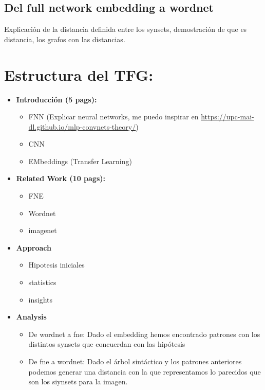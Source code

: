\documentclass[12,twoside]{TFG-GM}
\theoremstyle{definition}
\theoremstyle{remark}
\begin{document}
\subsection{Del full network embedding a wordnet}

Explicación de la distancia definida entre los synsets, demostración de que es distancia, los grafos con las distancias. 





\section{Estructura del TFG: }

\begin{itemize}
\item \textbf{Introducción (5 pags): }
\begin{itemize}
\item FNN (Explicar neural networks, me puedo inspirar en \url{https://upc-mai-dl.github.io/mlp-convnets-theory/})
\item CNN 
\item EMbeddings  (Transfer Learning)
\end{itemize}
\item \textbf{Related Work (10 pags):}
\begin{itemize}
\item FNE 
\item Wordnet 
\item imagenet 
\end{itemize}
\item \textbf{Approach }
\begin{itemize}
\item Hipotesis iniciales 
\item statistics 
\item insights 
\end{itemize}
\item \textbf{Analysis}
\begin{itemize}
\item De wordnet a fne: Dado el embedding hemos encontrado patrones con los distintos synsets que concuerdan con las hipótesis
\item De fne a wordnet: Dado el árbol sintáctico y los patrones anteriores podemos generar una distancia con la que representamos lo parecidos que son los siynsets para la imagen. 
\end{itemize}
\end{itemize}
\end{document}
